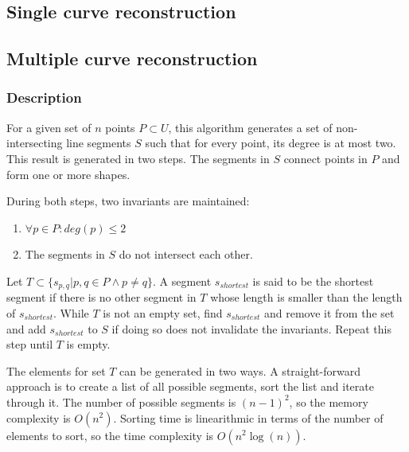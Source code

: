 \documentclass[11pt]{article}
\begin{document}
\subsection{Single curve reconstruction}

\subsection{Multiple curve reconstruction}
\subsubsection{Description}
For a given set of $n$ points $P \subset U$, this algorithm generates a set of non-intersecting line segments $S$ such that for every point, its degree is at most two. This result is generated in two steps. The segments in $S$ connect points in $P$ and form one or more shapes.

During both steps, two invariants are maintained:%
\noindent\begin{enumerate}\topsep=0pt\itemsep=0pt\parsep=0pt
\item $\forall p \in P : deg(p) \leq 2$
\item The segments in $S$ do not intersect each other.
\end{enumerate}


Let $T \subset \{s_{p,q} | p,q \in P \land p \neq q \}$. A segment $s_{shortest}$ is said to be the shortest segment if there is no other segment in $T$ whose length is smaller than the length of $s_{shortest}$.
While $T$ is not an empty set, find $s_{shortest}$ and remove it from the set and add $s_{shortest}$ to $S$ if doing so does not invalidate the invariants. Repeat this step until $T$ is empty.


The elements for set $T$ can be generated in two ways. A straight-forward approach is to create a list of all possible segments, sort the list and iterate through it. The number of possible segments is $(n-1)^2$, so the memory complexity is $O(n^2)$. Sorting time is linearithmic in terms of the number of elements to sort, so the time complexity is $O(n^2\log(n))$.
\end{document}
